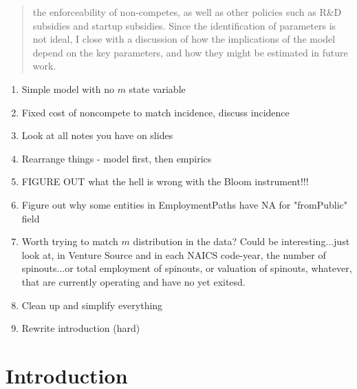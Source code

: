 \documentclass[12pt,english]{article}
\theoremstyle{remark}
\begin{document}
\begin{abstract}
the enforceability of non-competes, as well as other policies such as R\&D subsidies and startup subsidies. Since the identification of parameters is not ideal, I close with a discussion of how the implications of the model depend on the key parameters, and how they might be estimated in future work. 
	
\end{abstract}

\tableofcontents

\begin{enumerate}
	\item Simple model with no $m$ state variable
	\item Fixed cost of noncompete to match incidence, discuss incidence
	\item Look at all notes you have on slides
	\item Rearrange things - model first, then empirics
	\item FIGURE OUT what the hell is wrong with the Bloom instrument!!!
	\item Figure out why some entities in EmploymentPaths have NA for "fromPublic" field
	\item Worth trying to match $m$ distribution in the data? Could be interesting...just look at, in Venture Source and in each NAICS code-year, the number of spinouts...or total employment of spinouts, or valuation of spinouts, whatever, that are currently operating and have no yet exitesd.
	\item Clean up and simplify everything
	\item Rewrite introduction (hard)
\end{enumerate}

\section{Introduction}
\end{document}
